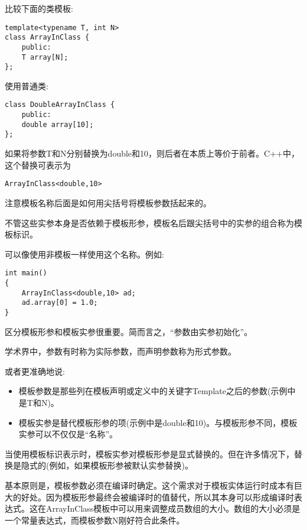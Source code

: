 
比较下面的类模板:

\begin{lstlisting}[style=styleCXX]
template<typename T, int N>
class ArrayInClass {
	public:
	T array[N];
};
\end{lstlisting}

使用普通类:

\begin{lstlisting}[style=styleCXX]
class DoubleArrayInClass {
	public:
	double array[10];
};
\end{lstlisting}

如果将参数T和N分别替换为double和10，则后者在本质上等价于前者。C++中，这个替换可表示为

\begin{lstlisting}[style=styleCXX]
ArrayInClass<double,10>
\end{lstlisting}

注意模板名称后面是如何用尖括号将模板参数括起来的。

不管这些实参本身是否依赖于模板形参，模板名后跟尖括号中的实参的组合称为模板标识。

可以像使用非模板一样使用这个名称。例如:

\begin{lstlisting}[style=styleCXX]
int main()
{
	ArrayInClass<double,10> ad;
	ad.array[0] = 1.0;
}
\end{lstlisting}

区分模板形参和模板实参很重要。简而言之，“参数由实参初始化”。

\begin{tcolorbox}[colback=webgreen!5!white,colframe=webgreen!75!black]
\hspace*{0.75cm}学术界中，参数有时称为实际参数，而声明参数称为形式参数。
\end{tcolorbox}

或者更准确地说:

\begin{itemize}
\item 
模板参数是那些列在模板声明或定义中的关键字Template之后的参数(示例中是T和N)。

\item 
模板实参是替代模板形参的项(示例中是double和10)。与模板形参不同，模板实参可以不仅仅是“名称”。
\end{itemize}

当使用模板标识表示时，模板实参对模板形参是显式替换的。但在许多情况下，替换是隐式的(例如，如果模板形参被默认实参替换)。

基本原则是，模板参数必须在编译时确定。这个需求对于模板实体运行时成本有巨大的好处。因为模板形参最终会被编译时的值替代，所以其本身可以形成编译时表达式。这在ArrayInClass模板中可以用来调整成员数组的大小。数组的大小必须是一个常量表达式，而模板参数N刚好符合此条件。

